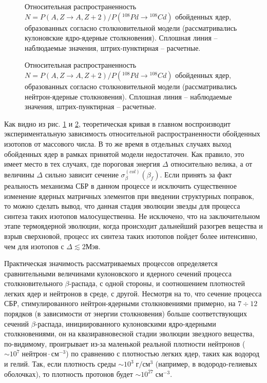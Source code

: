 \begin{figure}
\vspace{18 true cm}
\caption{{ Относительная распространенность $N=P(A,Z\to A,Z+2)/P({}^{108}Pd\to {}^{108}Cd)$
обойденных ядер, образованных согласно столкновительной модели (рассматривались
кулоновские ядро-ядерные столкновения).  Сплошная линия -- наблюдаемые значения, штрих-пунктирная -- расчетные.}}
\label{RCUL}
\end{figure}

\begin{figure}
\vspace{18 true cm}
\caption{{ Относительная распространенность $N=P(A,Z\to A,Z+2)/P({}^{108}Pd\to {}^{108}Cd)$
обойденных ядер, образованных согласно столкновительной модели
(рассматривались нейтрон-ядерные столкновения).
Сплошная линия -- наблюдаемые значения, штрих-пунктирная -- расчетные.}}
\label{RNEI}
\end{figure}


Как видно из рис. \ref{RCUL} и \ref{RNEI}, теоретическая кривая в главном воспроизводит
экспериментальную зависимость относительной распространенности обойденных
изотопов от массового числа. В то же время в отдельных случаях выход обойденных
ядер в рамках принятой модели недостаточен.
Как правило, это имеет место в тех случаях, где пороговая энергия $\Delta$ относительно велика,
а от величины $\Delta$ сильно зависит сечение $\sigma_\beta^{(col)}(\beta_f)$.
Если принять за факт реальность механизма СБР в данном процессе
и исключить существенное изменение ядерных матричных элементов
при введении структурных поправок, то можно сделать вывод, что данная
стадия эволюции звезды для процесса синтеза таких  изотопов малосущественна.
Не исключено, что на заключительном этапе термоядерной эволюции, когда
происходит дальнейший разогрев вещества и взрыв сверхновой, процесс их синтеза таких
изотопов пойдет более интенсивно, чем для изотопов с $\Delta\lesssim 2 Мэв$.

Практическая значимость рассматриваемых процессов определяется сравнительными
величинами кулоновского и ядерного сечений процесса столкновительного
$\beta$-распада, с одной стороны, и соотношением плотностей легких ядер и
нейтронов в среде, с другой. Несмотря на то, что сечение процесса СБР,
стимулированного нейтрон-ядерными столкновениями примерно, на $7 \div 12$
порядков (в зависимости от энергии столкновения) больше соответствующих
сечений $\beta$-распада, инициированного кулоновскими  ядро-ядерными столкновениями, он
на квазиравновесной стадии эволюции звездного вещества, по-видимому,
проигрывает из-за
маленькой реальной плотности нейтронов ($\sim 10^7 \; нейтрон \cdot см^{-3}$)
по сравнению с плотностью легких ядер, таких как водород и гелий. Так, если
плотность среды $\sim 10^3 \; г/см^3$ (например, в водородо-гелиевых оболочках),
то плотность протонов будет $\sim 10^{27} \; см^{-3}$.


